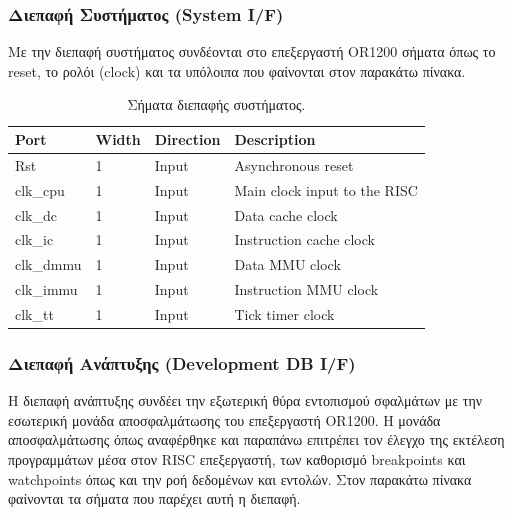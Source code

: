 \documentclass[a4paper,10pt]{article}
\numberwithin{figure}{section}
\numberwithin{table}{section}
\begin{document}
\subsubsection{Διεπαφή Συστήματος (System I/F)}

Με την διεπαφή συστήματος συνδέονται στο επεξεργαστή OR1200 σήματα όπως το reset, το ρολόι (clock) και τα υπόλοιπα που φαίνονται στον παρακάτω πίνακα.
\newpage
{%
\vspace{0.7cm}
\renewcommand{\arraystretch}{1.2}
\setlength{\tabcolsep}{0.3em}
\newcommand{\mc}[3]{\multicolumn{#1}{#2}{#3}}
\begin{table}[h]
\begin{center}
\begin{tabular}{|l|l|l|l|}
\hline
\rowcolor{tcA}
Port & Width & Direction & Description\\\hline
Rst & 1 & Input &Asynchronous reset\\\hline
clk\_cpu & 1 & Input & Main clock input to the RISC\\\hline
clk\_dc & 1 & Input &Data cache clock\\\hline
clk\_ic & 1 & Input & Instruction cache clock\\\hline
clk\_dmmu & 1 & Input & Data MMU clock\\\hline
clk\_immu & 1 & Input & Instruction MMU clock \\\hline
clk\_tt & 1 & Input & Tick timer clock\\\hline
\end{tabular}
\end{center}
\caption{Σήματα διεπαφής συστήματος.}
\end{table}
\vspace{0.7cm}
}%

\subsubsection{Διεπαφή Ανάπτυξης (Development DB I/F)}

H διεπαφή ανάπτυξης συνδέει την εξωτερική θύρα εντοπισμού σφαλμάτων με την εσωτερική μονάδα αποσφαλμάτωσης του επεξεργαστή OR1200. Η μονάδα αποσφαλμάτωσης όπως αναφέρθηκε και παραπάνω επιτρέπει τον έλεγχο της εκτέλεση προγραμμάτων μέσα στον RISC επεξεργαστή, των καθορισμό breakpoints και watchpoints όπως και την ροή δεδομένων και εντολών. Στον παρακάτω πίνακα φαίνονται τα σήματα που παρέχει αυτή η διεπαφή.
\end{document}
